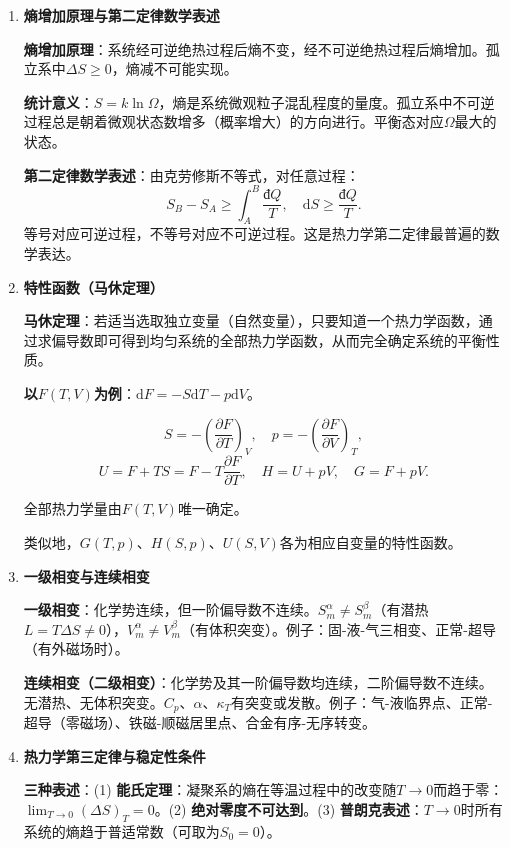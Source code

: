 \documentclass[12pt,a4paper,fontset=mac]{ctexart}
\newcommand{\dd}{\mathrm{d}}
\newcommand{\đ}{\mathrm{đ}}
\begin{document}
\begin{enumerate}

\item \textbf{熵增加原理与第二定律数学表述}

\textbf{熵增加原理}：系统经可逆绝热过程后熵不变，经不可逆绝热过程后熵增加。孤立系中$\Delta S\ge0$，熵减不可能实现。

\textbf{统计意义}：$S=k\ln\Omega$，熵是系统微观粒子混乱程度的量度。孤立系中不可逆过程总是朝着微观状态数增多（概率增大）的方向进行。平衡态对应$\Omega$最大的状态。

\textbf{第二定律数学表述}：由克劳修斯不等式，对任意过程：
\[S_B-S_A\ge\int_A^B\frac{\đ Q}{T},\quad \dd S\ge\frac{\đ Q}{T}.\]
等号对应可逆过程，不等号对应不可逆过程。这是热力学第二定律最普遍的数学表达。

\item \textbf{特性函数（马休定理）}

\textbf{马休定理}：若适当选取独立变量（自然变量），只要知道一个热力学函数，通过求偏导数即可得到均匀系统的全部热力学函数，从而完全确定系统的平衡性质。

\textbf{以$F(T,V)$为例}：$\dd F=-S\dd T-p\dd V$。

\[S=-\left(\frac{\partial F}{\partial T}\right)_V,\quad p=-\left(\frac{\partial F}{\partial V}\right)_T,\]
\[U=F+TS=F-T\frac{\partial F}{\partial T},\quad H=U+pV,\quad G=F+pV.\]

全部热力学量由$F(T,V)$唯一确定。

类似地，$G(T,p)$、$H(S,p)$、$U(S,V)$各为相应自变量的特性函数。

\item \textbf{一级相变与连续相变}

\textbf{一级相变}：化学势连续，但一阶偏导数不连续。$S_m^\alpha\neq S_m^\beta$（有潜热$L=T\Delta S\neq0$），$V_m^\alpha\neq V_m^\beta$（有体积突变）。例子：固-液-气三相变、正常-超导（有外磁场时）。

\textbf{连续相变（二级相变）}：化学势及其一阶偏导数均连续，二阶偏导数不连续。无潜热、无体积突变。$C_p$、$\alpha$、$\kappa_T$有突变或发散。例子：气-液临界点、正常-超导（零磁场）、铁磁-顺磁居里点、合金有序-无序转变。

\item \textbf{热力学第三定律与稳定性条件}

\textbf{三种表述}：(1) \textbf{能氏定理}：凝聚系的熵在等温过程中的改变随$T\to0$而趋于零：$\lim_{T\to0}(\Delta S)_T=0$。(2) \textbf{绝对零度不可达到}。(3) \textbf{普朗克表述}：$T\to0$时所有系统的熵趋于普适常数（可取为$S_0=0$）。


\end{enumerate}
\end{document}
